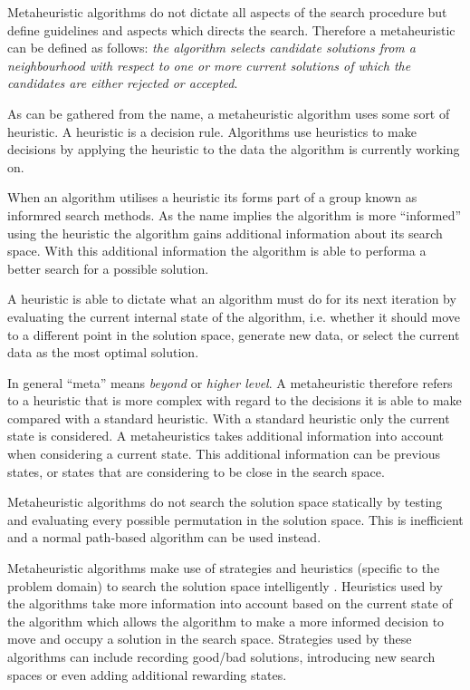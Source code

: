 Metaheuristic algorithms do not dictate all aspects of the search procedure but define guidelines and aspects which directs the search\cite{HandbookofMH}. Therefore a metaheuristic can be defined as follows: \emph{the algorithm selects candidate solutions from a neighbourhood with respect to one or more current solutions of which the candidates are either rejected or accepted}\cite{HandbookofMH}.

As can be gathered from the name, a metaheuristic algorithm uses some sort of heuristic. A heuristic is a decision rule. Algorithms use heuristics to make decisions by applying the heuristic to the data the algorithm is currently working on\cite{AIModernApproach,NatureInspiredMetaHeuristic}.

When an algorithm utilises a heuristic its forms part of a group known as informred search methods. As the name implies the algorithm is more ``informed'' using the heuristic the algorithm gains additional information about its search space. With this additional information the algorithm is able to performa a better search for a possible solution\cite{AIModernApproach}.

A heuristic is able to dictate what an algorithm must do for its next iteration by evaluating the current internal state of the algorithm, i.e. whether it should move to a different point in the solution space, generate new data, or select the current data as the most optimal solution\cite{AIModernApproach,NatureInspiredMetaHeuristic}.

In general ``meta'' means \emph{beyond} or \emph{higher level}\cite{AIModernApproach,NatureInspiredMetaHeuristic}. A metaheuristic therefore refers to a heuristic that is more complex with regard to the decisions it is able to make compared with a standard heuristic\cite{AIModernApproach,NatureInspiredMetaHeuristic}. With a standard heuristic only the current state is considered\cite{AIModernApproach}. A metaheuristics takes additional information into account when considering a current state\cite{NatureInspiredMetaHeuristic}. This additional information can be previous states, or states that are considering to be close in the search space\cite{AIModernApproach, NatureInspiredMetaHeuristic}.

Metaheuristic algorithms do not search the solution space statically by testing and evaluating every possible permutation in the solution space. This is inefficient and a normal path-based algorithm can be used instead\cite{MetaAgricultural}.

Metaheuristic algorithms make use of strategies and heuristics (specific to the problem domain) to search the solution space intelligently \cite{MetaAgricultural}. Heuristics used by the algorithms take more information into account based on the current state of the algorithm which allows the algorithm to make a more informed decision to move and occupy a solution in the search space\cite{AIModernApproach}. Strategies used by these algorithms can include recording good/bad solutions, introducing new search spaces or even adding additional rewarding states\cite{NatureInspiredMetaHeuristic,AIModernApproach,CompuIntelligenceIntro}. 

